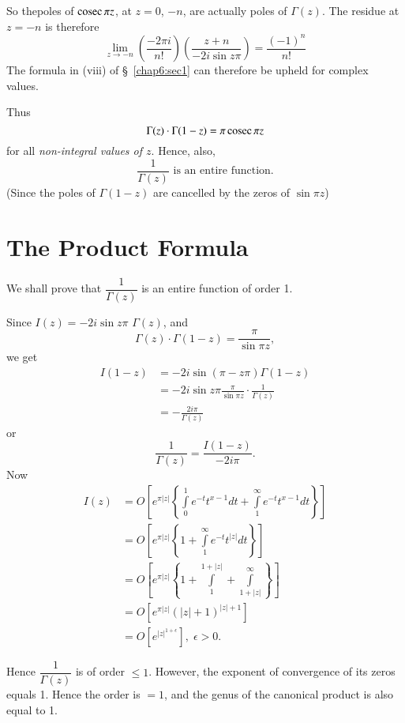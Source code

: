 So the\pageoriginale poles of $\operatorname{cosec} \pi z$, at $z=0$, $-n$, are
actually poles of $\Gamma (z)$. The residue at $z=-n$ is therefore
$$
\lim\limits_{z\to -n} \left(\frac{-2\pi i}{n!} \right)
\left(\frac{z+n}{-2i \sin z\pi} \right) = \frac{(-1)^n}{n!}
$$ 
The formula in (viii) of \S\ \ref{chap6:sec1} can therefore be upheld for complex
values.

Thus
$$
\Gamma (z) \cdot \Gamma (1-z) = \pi \operatorname{cosec} \pi z 
$$
for all \textit{non-integral values of $z$}. Hence, also,
$$
\frac{1}{\Gamma(z)} \text{ is an entire function.}
$$
(Since the poles of $\Gamma (1-z)$ are cancelled by the zeros of $\sin
\pi z$)


\section{The Product Formula}\label{chap6:sec3}

We shall prove that $\dfrac{1}{\Gamma (z)}$ is an entire function of
order 1.

Since $I(z) = - 2 i \sin z \pi$ $\Gamma (z)$, and 
$$
\Gamma (z) \cdot \Gamma (1-z) = \frac{\pi}{\sin \pi z},
$$
we get
\begin{align*}
I(1-z) & = - 2 i \sin (\pi - z \pi) \Gamma (1-z)\\
& = -2 i \sin z \pi \frac{\pi}{\sin \pi z} \cdot \frac{1}{\Gamma(z)}\\
& = - \frac{2 i \pi}{\Gamma (z)}
\end{align*}
or
$$
\frac{1}{\Gamma(z)} = \frac{I(1-z)}{-2i\pi}.
$$
Now\pageoriginale 
\begin{align*}
I(z) & = O \left[e^{\pi|z|} \left\{\int\limits^1_0 e^{-t} t^{x-1} d t
  + \int\limits^\infty_1 e^{-t} t^{x-1} dt \right\} \right]\\
& = O \left[e^{\pi|z|} \left\{ 1+\int\limits^\infty_1 e^{-t} t^{|z|}
  dt\right\} \right] \\
& = O \left[e^{\pi|z|} \left\{1 + \int\limits^{1+|z|}_1 +
  \int\limits^{\infty}_{1+|z|} \right\} \right] \\
& = O \left[e^{\pi|z|} (|z| +1)^{|z| +1} \right]\\
& = O \left[e^{|z|^{1+\epsilon}} \right], \; \epsilon > 0.
\end{align*}

Hence $\dfrac{1}{\Gamma(z)}$ is of order $\leq 1$. However, the
exponent of convergence of its zeros equals 1. Hence the order is
$=1$, and the genus of the canonical product is also equal to 1. 

